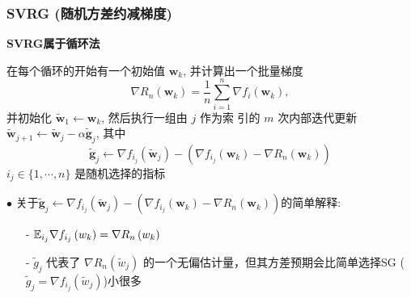 \documentclass[handout]{beamer}
\begin{document}
\begin{frame}[fragile]
  \frametitle{SVRG (随机方差约减梯度)}

  \textbf{SVRG属于循环法}

  在每个循环的开始有一个初始值 $\boldsymbol{w}_k$, 并计算出一个批量梯度 
  $$
  \nabla R_n\left(\boldsymbol{w}_k\right)=\frac{1}{n} \sum_{i=1}^n \nabla f_i\left(\boldsymbol{w}_k\right),
  $$
   并初始化 $\tilde{\boldsymbol{w}}_1 \leftarrow \boldsymbol{w}_k$, 然后执行一组由 $j$ 作为索 引的 $m$ 次内部迭代更新 $\tilde{\boldsymbol{w}}_{j+1} \leftarrow \tilde{\boldsymbol{w}}_j-\alpha \tilde{\boldsymbol{g}}_j$, 其中
  $$
  \tilde{\boldsymbol{g}}_j \leftarrow \nabla f_{i_j}\left(\tilde{\boldsymbol{w}}_j\right)-\left(\nabla f_{i_j}\left(\boldsymbol{w}_k\right)-\nabla R_n\left(\boldsymbol{w}_k\right)\right)
  $$
  $i_j \in\{1, \cdots, n\}$ 是随机选择的指标

  \bigskip

  $\bullet$ 关于$\tilde{\boldsymbol{g}}_j \leftarrow \nabla f_{i_j}\left(\tilde{\boldsymbol{w}}_j\right)-\left(\nabla f_{i_j}\left(\boldsymbol{w}_k\right)-\nabla R_n\left(\boldsymbol{w}_k\right)\right)$的简单解释:
   \begin{itemize}
      \item[-]  $\mathbb{E}_{i_j} \nabla f_{i_{j}}\left(w_{k}\right) = \nabla R_{n}\left(w_{k}\right)$\\
      \item[-] $\tilde{g}_{j}$ 代表了 $\nabla R_{n}\left(\tilde{w}_{j}\right)$ 的一个无偏估计量，但其方差预期会比简单选择SG ($\tilde{g}_{j}=\nabla f_{i_{j}}\left(\tilde{w}_{j}\right)$)小很多
      
  \end{itemize}

  
\end{frame}
\end{document}
